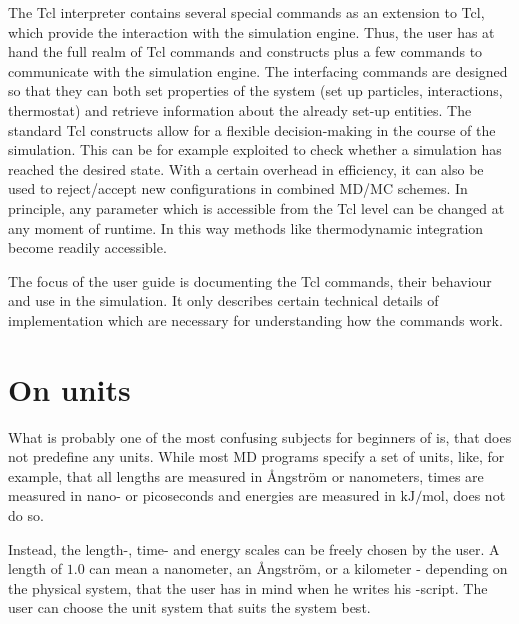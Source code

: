 The Tcl interpreter contains several special commands as an
extension to Tcl, which provide the interaction with the
simulation engine. Thus, the user has at hand the full realm
of Tcl commands and constructs plus a few commands to communicate
with the simulation engine. The interfacing commands are designed
so that they can both set properties of the system (set up particles,
interactions, thermostat) and retrieve information about the already 
set-up entities. The standard Tcl constructs allow for a flexible 
decision-making in the course of the simulation. This can be for example
exploited to check whether a simulation has reached the desired state.
With a certain overhead in efficiency, it can also be used to reject/accept
new configurations in combined MD/MC schemes. In principle, any parameter
which is accessible from the Tcl level can be changed at any moment of runtime.
In this way methods like thermodynamic integration become readily accessible.

The focus of the user guide is documenting the Tcl commands, their behaviour
and use in the simulation. It only describes certain technical details 
of implementation which are necessary for understanding how the commands work.


\section{On units}
\label{sec:units}

What is probably one of the most confusing subjects for beginners of
\es is, that \es does not predefine any units.  While most MD programs
specify a set of units, like, for example, that all lengths are
measured in \AA ngstr\"om or nanometers, times are measured in nano- or
picoseconds and energies are measured in $\mathrm{kJ/mol}$,
\es does not do so.

Instead, the length-, time- and energy scales can be freely chosen by
the user.  A length of $1.0$ can mean a nanometer, an \AA ngstr\"om,
or a kilometer - depending on the physical system, that the user has
in mind when he writes his \es-script.  The user can choose the unit
system that suits the system best.

